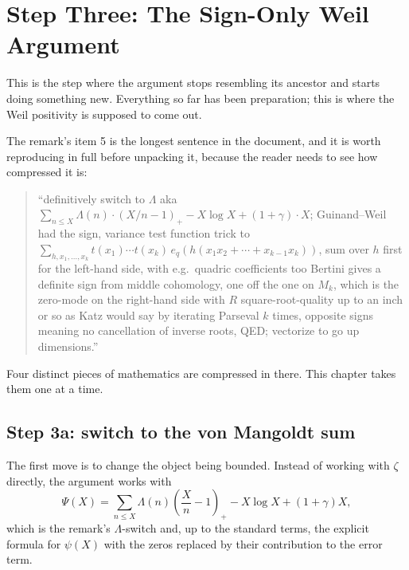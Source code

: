 
\chapter{Step Three: The Sign-Only Weil Argument}
\label{ch:step3}

This is the step where the argument stops resembling its ancestor and starts
doing something new. Everything so far has been preparation; this is where the
Weil positivity is supposed to come out.

The remark's item 5 is the longest sentence in the document, and it is worth
reproducing in full before unpacking it, because the reader needs to see how
compressed it is:

\begin{quote}
\small
``definitively switch to $\Lambda$ aka $\sum_{n \le X}\Lambda(n)\cdot(X/n-1)_+ -
X\log X + (1+\gamma)\cdot X$; Guinand--Weil had the sign, variance test function
trick to $\sum_{h,x_1,\dots,x_k} t(x_1)\cdots t(x_k)\,e_q(h(x_1x_2 + \cdots +
x_{k-1}x_k))$, sum over $h$ first for the left-hand side, with e.g.\ quadric
coefficients too Bertini gives a definite sign from middle cohomology, one off
the one on $M_k$, which is the zero-mode on the right-hand side with $R$
square-root-quality up to an inch or so as Katz would say by iterating Parseval
$k$ times, opposite signs meaning no cancellation of inverse roots, QED;
vectorize to go up dimensions.''
\end{quote}

Four distinct pieces of mathematics are compressed in there. This chapter
takes them one at a time.

\section{Step 3a: switch to the von Mangoldt sum}The first move is to change the object being bounded. Instead of working with
$\zeta$ directly, the argument works with
\begin{equation}
\Psi(X) = \sum_{n \le X}\Lambda(n)\left(\frac{X}{n} - 1\right)_{+} - X\log X + (1+\gamma)X,
\label{eq:psi}
\end{equation}
which is the remark's $\Lambda$-switch and, up to the standard terms, the
explicit formula for $\psi(X)$ with the zeros replaced by their contribution to
the error term.

